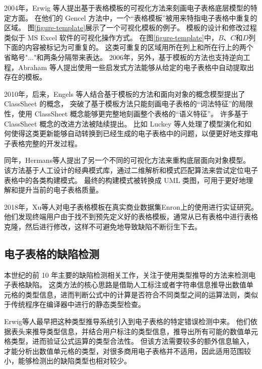

2004年，Erwig 等人\cite{erwig2004gencel,erwig2005automatic,abraham2005goal}提出基于表格模板的可视化方法来刻画电子表格底层模型的特定方面。
在他们的 Gencel 方法中，一个“表格模板”被用来特指电子表格中重复的区域。
图\ref{figure-template}展示了一个可视化模板的例子。
模板的设计和修改过程类似于 MS Excel 软件的可视化操作方式。
在图\ref{figure-template}中，$B$、$C$和$D$列下面的内容被标记为可重复的。
这类可重复的区域用所在列上和所在行上的两个省略号"..."和两条分隔带来表达。
2006年，另外，基于模板的方法也支持逆向工程，Abraham 等人\cite{abraham2006inferring}提出使用一些启发式方法能够从给定的电子表格中自动提取出存在的模板。

2010年，后来，Engels 等人\cite{engels2005classsheets,cunha2010automatically}结合基于模板的方法和面向对象的概念模型提出了 ClassSheet 的概念，
突破了基于模板方法只能刻画电子表格的“词法特征”的局限性，使用 ClassSheet 概念能够更完整地刻画整个表格的“语义特征”。
许多基于 ClassSheet 概念的改进方法被陆续提出\cite{luckey2012systematic,cunha2011type,cunha2011embedding,cunha2012bidirectional}。
比如 Luckey 等人\cite{luckey2012systematic}处理了模型演化和如何使得这类更新能够自动转换到已经生成的电子表格中的问题，以便更好地支撑电子表格完整的开发过程。

同年，Hermans等人\cite{hermans2010automatically}提出了另一个不同的可视化方法来重构底层面向对象模型。
该方法基于人工设计的经典模式库，通过二维解析和模式匹配算法来尝试定位电子表格中的各类构建模式。
最终的构建模式被转换成 UML 类图，可用于更好地理解和提升当前的电子表格质量。

2018年，Xu等人\cite{xu2018spreadsheet}对电子表格模板在真实商业数据集Enron上的使用进行实证研究。
他们发现终端用户由于找不到预先定义好的表格模板，通常从已有表格中进行表格克隆，然后进行修改，这样不可避免地导致缺陷不断衍生下去。

\subsection{电子表格的缺陷检测}
本世纪的前 10 年主要的缺陷检测相关工作，关注于使用类型推导的方法\cite{erwig2002adding,burnett2002testing,ahmad2003type,abraham2004header,abraham2006type,abraham2007ucheck,antoniu2004validating,chambers2009automatic,chambers2010reasoning}来检测电子表格缺陷。
这类方法的核心思路是借助人工标注或者字符串信息推导出数值单元格的类型信息，进而判断公式中的计算是否符合不同类型之间的运算法则，类似于传统程序在编译器中进行的静态类型检查。

Erwig等人\cite{erwig2002adding,abraham2004header,chambers2009automatic}最早把这种类型推导系统引入到电子表格的特定错误检测中来。
他们依据表头来推导类型信息，并结合用户标注的类型信息，推导出所有可能的数值单元格类型，进而验证公式运算的类型合法性。
但该方法需要较多的额外信息输入，才能分析出数值单元格的类型，对很多商用电子表格并不适用，因此适用范围较小，能够检测出的缺陷类型也相对较少。

